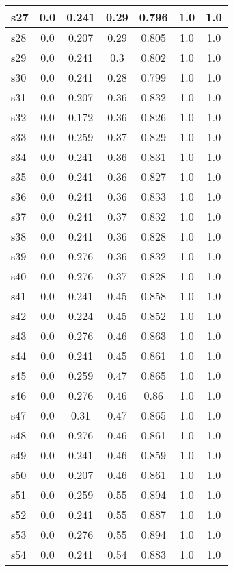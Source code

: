 \documentclass{article}
\begin{document}
\begin{tabular}{|l|c|c|c|c|c|c|}
\hline
s27 &0.0 & 0.241 & 0.29 & 0.796 & 1.0 & 1.0\\
\hline
s28 &0.0 & 0.207 & 0.29 & 0.805 & 1.0 & 1.0\\
\hline
s29 &0.0 & 0.241 & 0.3 & 0.802 & 1.0 & 1.0\\
\hline
s30 &0.0 & 0.241 & 0.28 & 0.799 & 1.0 & 1.0\\
\hline
s31 &0.0 & 0.207 & 0.36 & 0.832 & 1.0 & 1.0\\
\hline
s32 &0.0 & 0.172 & 0.36 & 0.826 & 1.0 & 1.0\\
\hline
s33 &0.0 & 0.259 & 0.37 & 0.829 & 1.0 & 1.0\\
\hline
s34 &0.0 & 0.241 & 0.36 & 0.831 & 1.0 & 1.0\\
\hline
s35 &0.0 & 0.241 & 0.36 & 0.827 & 1.0 & 1.0\\
\hline
s36 &0.0 & 0.241 & 0.36 & 0.833 & 1.0 & 1.0\\
\hline
s37 &0.0 & 0.241 & 0.37 & 0.832 & 1.0 & 1.0\\
\hline
s38 &0.0 & 0.241 & 0.36 & 0.828 & 1.0 & 1.0\\
\hline
s39 &0.0 & 0.276 & 0.36 & 0.832 & 1.0 & 1.0\\
\hline
s40 &0.0 & 0.276 & 0.37 & 0.828 & 1.0 & 1.0\\
\hline
s41 &0.0 & 0.241 & 0.45 & 0.858 & 1.0 & 1.0\\
\hline
s42 &0.0 & 0.224 & 0.45 & 0.852 & 1.0 & 1.0\\
\hline
s43 &0.0 & 0.276 & 0.46 & 0.863 & 1.0 & 1.0\\
\hline
s44 &0.0 & 0.241 & 0.45 & 0.861 & 1.0 & 1.0\\
\hline
s45 &0.0 & 0.259 & 0.47 & 0.865 & 1.0 & 1.0\\
\hline
s46 &0.0 & 0.276 & 0.46 & 0.86 & 1.0 & 1.0\\
\hline
s47 &0.0 & 0.31 & 0.47 & 0.865 & 1.0 & 1.0\\
\hline
s48 &0.0 & 0.276 & 0.46 & 0.861 & 1.0 & 1.0\\
\hline
s49 &0.0 & 0.241 & 0.46 & 0.859 & 1.0 & 1.0\\
\hline
s50 &0.0 & 0.207 & 0.46 & 0.861 & 1.0 & 1.0\\
\hline
s51 &0.0 & 0.259 & 0.55 & 0.894 & 1.0 & 1.0\\
\hline
s52 &0.0 & 0.241 & 0.55 & 0.887 & 1.0 & 1.0\\
\hline
s53 &0.0 & 0.276 & 0.55 & 0.894 & 1.0 & 1.0\\
\hline
s54 &0.0 & 0.241 & 0.54 & 0.883 & 1.0 & 1.0\\

\end{tabular}
\end{document}
